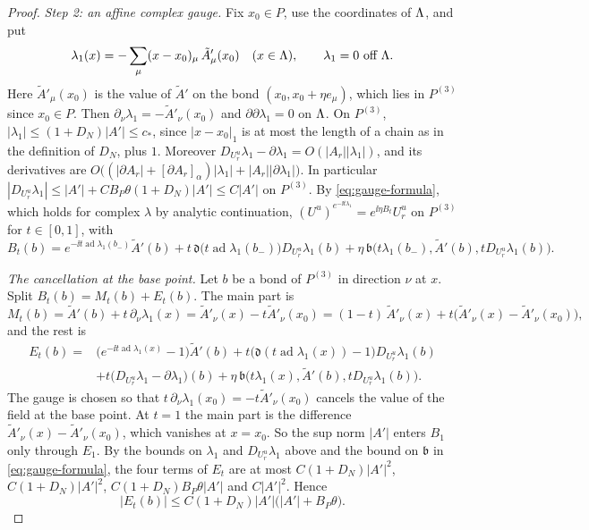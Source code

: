 \begin{proof}
\emph{Step 2: an affine complex gauge.} Fix $x_0\in P$, use the coordinates of $\Lambda$, and put
\[
\lambda_1(x)=-\sum_\mu(x-x_0)_\mu\,\tilde A'_\mu(x_0)\quad(x\in\Lambda),\qquad\lambda_1=0\ \text{off }\Lambda .
\]
Here $\tilde A'_\mu(x_0)$ is the value of $\tilde A'$ on the bond $(x_0,x_0+\eta e_\mu)$, which lies in $P^{(3)}$ since $x_0\in P$. Then $\partial_\nu\lambda_1=-\tilde A'_\nu(x_0)$ and $\partial\partial\lambda_1=0$ on $\Lambda$. On $P^{(3)}$, $|\lambda_1|\le(1+D_N)|A'|\le c_*$, since $|x-x_0|_1$ is at most the length of a chain as in the definition of $D_N$, plus $1$. Moreover $D_{U_r^u}\lambda_1-\partial\lambda_1=O(|A_r||\lambda_1|)$, and its derivatives are $O\big((|\partial A_r|+[\partial A_r]_\alpha)|\lambda_1|+|A_r||\partial\lambda_1|\big)$. In particular $|D_{U_r^u}\lambda_1|\le|A'|+CB_P\theta(1+D_N)|A'|\le C|A'|$ on $P^{(3)}$. By \eqref{eq:gauge-formula}, which holds for complex $\lambda$ by analytic continuation, $(U^u)^{e^{-\ii t\lambda_1}}=e^{\ii\eta B_t}U_r^u$ on $P^{(3)}$ for $t\in[0,1]$, with
\[
B_t(b)=e^{-\ii t\operatorname{ad}\lambda_1(b_-)}\tilde A'(b)+t\,\mathfrak d\big(t\operatorname{ad}\lambda_1(b_-)\big)D_{U_r^u}\lambda_1(b)+\eta\,\mathfrak b\big(t\lambda_1(b_-),\tilde A'(b),tD_{U_r^u}\lambda_1(b)\big).
\]

\emph{The cancellation at the base point.} Let $b$ be a bond of $P^{(3)}$ in direction $\nu$ at $x$. Split $B_t(b)=M_t(b)+E_t(b)$. The main part is
\[
M_t(b)=\tilde A'(b)+t\,\partial_\nu\lambda_1(x)=\tilde A'_\nu(x)-t\tilde A'_\nu(x_0)=(1-t)\,\tilde A'_\nu(x)+t\big(\tilde A'_\nu(x)-\tilde A'_\nu(x_0)\big),
\]
and the rest is
\begin{align*}
E_t(b)={}&\big(e^{-\ii t\operatorname{ad}\lambda_1(x)}-1\big)\tilde A'(b)+t\big(\mathfrak d(t\operatorname{ad}\lambda_1(x))-1\big)D_{U_r^u}\lambda_1(b)\\
&+t\big(D_{U_r^u}\lambda_1-\partial\lambda_1\big)(b)+\eta\,\mathfrak b\big(t\lambda_1(x),\tilde A'(b),tD_{U_r^u}\lambda_1(b)\big).
\end{align*}
The gauge is chosen so that $t\,\partial_\nu\lambda_1(x_0)=-t\tilde A'_\nu(x_0)$ cancels the value of the field at the base point. At $t=1$ the main part is the difference $\tilde A'_\nu(x)-\tilde A'_\nu(x_0)$, which vanishes at $x=x_0$. So the sup norm $|A'|$ enters $B_1$ only through $E_1$. By the bounds on $\lambda_1$ and $D_{U_r^u}\lambda_1$ above and the bound on $\mathfrak b$ in \eqref{eq:gauge-formula}, the four terms of $E_t$ are at most $C(1+D_N)|A'|^2$, $C(1+D_N)|A'|^2$, $C(1+D_N)B_P\theta|A'|$ and $C|A'|^2$. Hence
\[
|E_t(b)|\le C(1+D_N)|A'|\big(|A'|+B_P\theta\big).
\]


\end{proof}
